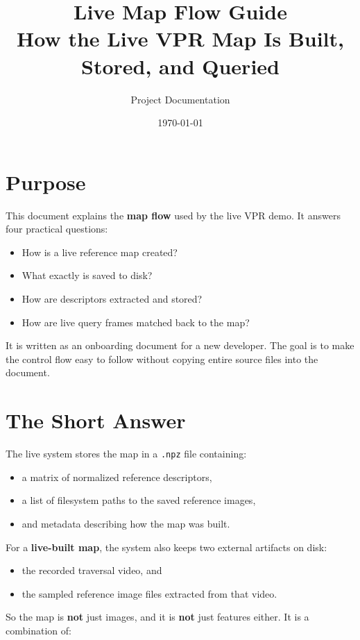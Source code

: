 \documentclass[11pt]{article}
\title{\textbf{Live Map Flow Guide}\\[4pt]
How the Live VPR Map Is Built, Stored, and Queried}
\author{Project Documentation}
\date{\today}
\newcommand{\file}[1]{\texttt{#1}}
\begin{document}
\maketitle

\section*{Purpose}
This document explains the \textbf{map flow} used by the live VPR demo. It answers four practical questions:

\begin{itemize}[leftmargin=*]
  \item How is a live reference map created?
  \item What exactly is saved to disk?
  \item How are descriptors extracted and stored?
  \item How are live query frames matched back to the map?
\end{itemize}

It is written as an onboarding document for a new developer. The goal is to make the control flow easy to follow without copying entire source files into the document.

\section{The Short Answer}
The live system stores the map in a \file{.npz} file containing:

\begin{itemize}[leftmargin=*]
  \item a matrix of normalized reference descriptors,
  \item a list of filesystem paths to the saved reference images,
  \item and metadata describing how the map was built.
\end{itemize}

For a \textbf{live-built map}, the system also keeps two external artifacts on disk:

\begin{itemize}[leftmargin=*]
  \item the recorded traversal video, and
  \item the sampled reference image files extracted from that video.
\end{itemize}

So the map is \textbf{not} just images, and it is \textbf{not} just features either. It is a combination of:
\end{document}
